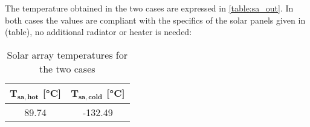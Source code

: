 The temperature obtained in the two cases are expressed in \autoref{table:sa_out}. 
In both cases the values are compliant with the specifics of the solar panels given in \mref (table), no additional radiator or heater is needed:

\begin{table}[H]
    \renewcommand{\arraystretch}{1.3}
    \centering
    \begin{tabular}{|c|c|}
        \hline
        $\boldsymbol{T_{sa,hot}}$ [°C] & $\boldsymbol{T_{sa,cold}}$ [°C]  \\
        \hline
        89.74 & -132.49 \\
        \hline
    \end{tabular}
    \caption{Solar array temperatures for the two cases}
    \label{table:sa_out}
\end{table}